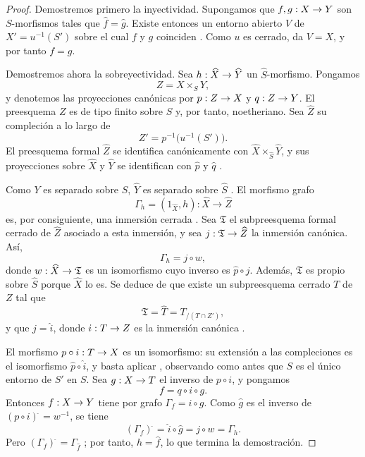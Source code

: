 \documentclass[oneside]{amsart}
\makeatletter
\newcommand{\ega@arrow}[2]{\mathchoice{#1}{#2}{#2}{#2}}
\renewcommand{\to}{\ega@arrow{\longrightarrow}{\rightarrow}}
\newcommand{\oldpage}[2][]{{\marginnote{\normalfont\textbf{#1}~|~#2}}\ignorespaces}
\makeatother
\begin{document}
\begin{proof}
Demostremos primero la inyectividad. Supongamos que $f,g:X\to Y$ son
$S$-morfismos tales que $\widehat{f}=\widehat{g}$. Existe entonces
un entorno abierto $V$ de $X'=u^{-1}(S')$ sobre el cual $f$ y $g$
coinciden . Como $u$ es cerrado,
 da $V=X$, y por tanto $f=g$.

Demostremos ahora la sobreyectividad. Sea
$h:\widehat{X}\to\widehat{Y}$ un
$\widehat{S}$-morfismo. Pongamos
\[
  Z=X\times_S Y,
\]
y denotemos las proyecciones canónicas por $p:Z\to X$ y
$q:Z\to Y$. El preesquema $Z$ es de tipo finito sobre $S$
 y, por tanto, noetheriano. Sea
$\widehat{Z}$ su compleción a lo largo de
\[
  Z'=p^{-1}\bigl(u^{-1}(S')\bigr).
\]
El preesquema formal $\widehat{Z}$ se identifica canónicamente con
$\widehat{X}\times_{\widehat{S}}\widehat{Y}$, y sus proyecciones
sobre $\widehat{X}$ y $\widehat{Y}$ se identifican con
$\widehat{p}$ y $\widehat{q}$ .

Como $Y$ es separado sobre $S$, $\widehat{Y}$ es separado sobre
$\widehat{S}$ . El morfismo grafo
\[
  \Gamma_h=(1_{\widehat{X}},h):
  \widehat{X}\longrightarrow\widehat{Z}
\]
es, por consiguiente, una inmersión cerrada . Sea
$\mathfrak{T}$ el subpreesquema formal cerrado de
$\widehat{Z}$ asociado a esta inmersión, y sea
$j:\mathfrak{T}\to\widehat{Z}$ la inmersión canónica. Así,
\[
  \Gamma_h=j\circ w,
\]
donde $w:\widehat{X}\to\mathfrak{T}$ es un isomorfismo
 cuyo inverso es
$\widehat{p}\circ j$. Además, $\mathfrak{T}$ es propio sobre
$\widehat{S}$ porque $\widehat{X}$ lo es. Se deduce de
 que existe un subpreesquema cerrado $T$ de $Z$
tal que
\[
  \mathfrak{T}
  =\widehat{T}
  =T_{/(T\cap Z')},
\]
y que $j=\widehat{i}$, donde $i:T\to Z$ es la inmersión
canónica .

El morfismo $p\circ i:T\to X$ es un isomorfismo: su extensión a
las compleciones es el isomorfismo
$\widehat{p}\circ\widehat{i}$, y basta aplicar
, observando como antes que $S$ es el único
entorno de $S'$ en $S$.
\oldpage[III]{157}
Sea $g:X\to T$ el inverso de $p\circ i$, y pongamos
\[
  f=q\circ i\circ g.
\]
Entonces $f:X\to Y$ tiene por grafo $\Gamma_f=i\circ g$. Como
$\widehat{g}$ es el inverso de
$(p\circ i)^{\widehat{\,}}=w^{-1}$, se tiene
\[
  (\Gamma_f)^{\widehat{\,}}
  =\widehat{i}\circ\widehat{g}
  =j\circ w
  =\Gamma_h.
\]
Pero $(\Gamma_f)^{\widehat{\,}}=\Gamma_{\widehat{f}}$
; por tanto, $h=\widehat{f}$, lo que termina la
demostración.
\end{proof}
\end{document}
